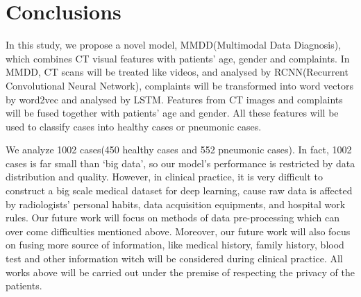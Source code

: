 \documentclass[runningheads]{llncs}
\begin{document}
\section{Conclusions}
\label{conclude}
In this study, we propose a novel model, MMDD(Multimodal Data Diagnosis), which combines CT visual features with patients' age, gender and complaints. In MMDD, CT scans will be treated like videos, and analysed by RCNN(Recurrent Convolutional Neural Network), complaints will be transformed into word vectors by word2vec and analysed by LSTM. Features from CT images and complaints will be fused together with patients' age and gender. All these features will be used to classify cases into healthy cases or pneumonic cases.

We analyze 1002 cases(450 healthy cases and 552 pneumonic cases). In fact, 1002 cases is far small than `big data', so our model's performance is restricted by data distribution and quality. However, in clinical practice, it is very difficult to construct a big scale medical dataset for deep learning, cause raw data is affected by radiologists' personal habits, data acquisition equipments, and hospital work rules. Our future work will focus on methods of data pre-processing which can over come difficulties mentioned above.
Moreover, our future work will also focus on fusing more source of information, like medical history, family history, blood test and other information witch will be considered during clinical practice. All works above will be carried out under the premise of respecting the privacy of the patients.
 


  
\end{document}
